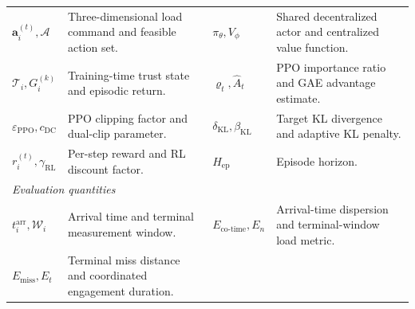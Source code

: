 \documentclass[lettersize,journal]{IEEEtran}
\begin{document}
\begin{table}[!t]
\begin{tabular}{@{}p{}p{}p{}p{}@{}}
$\mathbf a_i^{(t)},\mathcal A$ & Three-dimensional load command and feasible action set. &
$\pi_\theta,V_\phi$ & Shared decentralized actor and centralized value function.\\
$\mathcal T_i,G_i^{(k)}$ & Training-time trust state and episodic return. &
$\varrho_t,\widehat A_t$ & PPO importance ratio and GAE advantage estimate.\\
$\varepsilon_{\mathrm{PPO}},c_{\mathrm{DC}}$ & PPO clipping factor and dual-clip parameter. &
$\delta_{\mathrm{KL}},\beta_{\mathrm{KL}}$ & Target KL divergence and adaptive KL penalty.\\
$r_i^{(t)},\gamma_{\mathrm{RL}}$ & Per-step reward and RL discount factor. &
$H_{\mathrm{ep}}$ & Episode horizon.\\
\midrule
\multicolumn{4}{l}{\emph{Evaluation quantities}}\\
$t_i^{\mathrm{arr}},\mathcal W_i$ & Arrival time and terminal measurement window. &
$E_{\mathrm{co\text{-}time}},E_n$ & Arrival-time dispersion and terminal-window load metric.\\
$E_{\mathrm{miss}},E_t$ & Terminal miss distance and coordinated engagement duration. & & \\
\bottomrule
\end{tabular}
\end{table}
 
\end{document}

